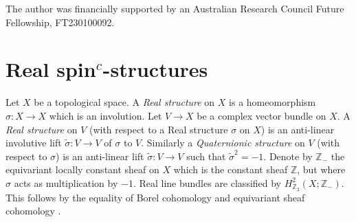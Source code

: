 \documentclass{amsart}
\theoremstyle{definition}
\theoremstyle{remark}
\numberwithin{equation}{section}
\begin{document}
 The author was financially supported by an Australian Research Council Future Fellowship, FT230100092.



\section{Real spin$^c$-structures}\label{sec:rspinc}

Let $X$ be a topological space. A {\em Real structure} on $X$ is a homeomorphism $\sigma : X \to X$ which is an involution. Let $V \to X$ be a complex vector bundle on $X$. A {\em Real structure} on $V$ (with respect to a Real structure $\sigma$ on $X$) is an anti-linear involutive lift $\widetilde{\sigma} : V \to V$ of $\sigma$ to $V$. Similarly a {\em Quaternionic structure} on $V$ (with respect to $\sigma$) is an anti-linear lift $\widetilde{\sigma} : V \to V$ such that $\widetilde{\sigma}^2 = -1$. Denote by $\mathbb{Z}_{-}$ the equivariant locally constant sheaf on $X$ which is the constant sheaf $\mathbb{Z}$, but where $\sigma$ acts as multiplication by $-1$. Real line bundles are classified by $H^2_{\mathbb{Z}_2}( X ; \mathbb{Z}_-)$. This follows by the equality of Borel cohomology and equivariant sheaf cohomology \cite{sti}.
\end{document}
